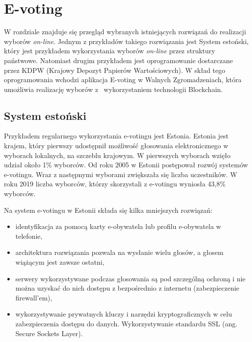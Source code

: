 \documentclass[a4paper,12pt]{book}
\begin{document}
\newpage

\chapter{E-voting}
W rozdziale znajduje się przegląd wybranych istniejących rozwiązań do realizacji wyborów \textit{on-line}. Jednym z przykładów takiego rozwiązania jest System estoński, który jest przykładem wykorzystania wyborów \textit{on-line} przez struktury państwowe. Natomiast drugim przykładem jest oprogramowanie dostarczane przez KDPW (Krajowy Depozyt Papierów Wartościowych). W skład tego oprogramowania wchodzi aplikacja E-voting w Walnych Zgromadzeniach, która umożliwia realizację wyborów z~ wykorzystaniem technologii Blockchain.

\section{System estoński}
Przykładem regularnego wykorzystania e-votingu jest Estonia. Estonia jest krajem, który pierwszy udostępnił możliwość głosowania elektronicznego w wyborach lokalnych, na szczeblu krajowym. W pierwszych wyborach wzięło udział około 1\% wyborców. Od roku 2005 w Estonii postępował rozwój systemów e-votingu. Wraz z następnymi wyborami zwiększała się liczba uczestników. W roku 2019 liczba wyborców, którzy skorzystali z e-votingu wyniosła 43,8\% wyborców.

Na system e-votingu w Estonii składa się kilka mniejszych rozwiązań:
\begin{itemize}

\item identyfikacja za pomocą karty e-obywatela lub profilu e-obywatela w telefonie,

\item architektura rozwiązania pozwala na wysłanie wielu głosów, a głosem wiążącym jest zawsze ostatni,

\item serwery wykorzystywane podczas głosowania są pod szczególną ochroną i nie można uzyskać do nich dostępu z bezpośrednio z internetu (zabezpieczenie firewall'em),

\item wykorzystywanie prywatnych kluczy i narzędzi kryptograficznych w celu zabezpieczenia dostępu do danych. Wykorzystywanie standardu SSL (ang. Secure Sockets Layer).
\end{itemize}
\end{document}
